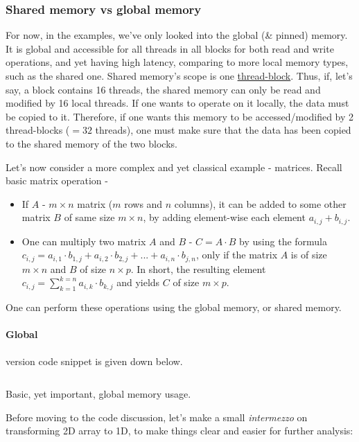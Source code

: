 \subsubsection{Shared memory vs global memory}

For now, in the examples, we've only looked into the global (\& pinned) memory. It is global and accessible 
for all threads in all blocks for both read and write operations, and yet having high latency, comparing to 
more local memory types, such as the shared one. Shared memory's scope is one \underline{thread-block}. Thus, if, let's say,
a block contains 16 threads, the shared memory can only be read and modified by 16 local threads. If one wants to operate on it 
locally, the data must be copied to it. Therefore, if one wants this memory to be accessed/modified by 2 thread-blocks ($=32$ threads), one 
must make sure that the data has been copied to the shared memory of the two blocks.

Let's now consider a more complex and yet classical example - matrices. Recall basic matrix operation - 
\begin{itemize}
   \setlength\itemsep{-0.5em}
   \item If $A$ - $m\times n$ matrix ($m$ rows and $n$ columns), it can be added to some 
   other matrix $B$ of same size $m\times n$, by adding element-wise each element $a_{i,j}+b_{i,j}$. 
   \item One can multiply two matrix $A$ and $B$ - $C = A\cdot B$ by using the formula 
   $c_{i,j} = a_{i,1}\cdot b_{1,j} + a_{i,2}\cdot b_{2,j} + ... + a_{i, n}\cdot b_{j,n}$, only if the matrix 
   $A$ is of size $m\times n$ and $B$ of size $n\times p$. In short, the resulting 
   element $c_{i,j} = \sum_{k=1}^{k=n}a_{i,k}\cdot b_{k,j}$ and yields $C$ of size $m\times p$.
\end{itemize}

One can perform these operations using the global memory, or shared memory.

\paragraph{Global} version code snippet is given down below.
\begin{listing}
\inputminted[linenos=true, frame=single]{cuda}{cucodes/matmulglob.cu}
    \caption{Basic, yet important, global memory usage. \cite{tuomanen2018hands}}
\end{listing}

Before moving to the code discussion, let's make a small \textit{intermezzo}
on transforming 2D array to 1D, to make things clear and easier for further analysis:

